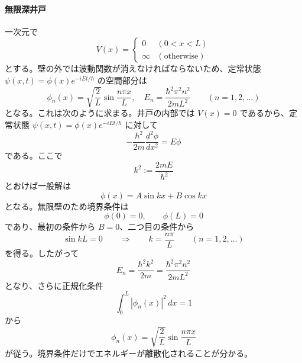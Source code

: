 \paragraph{無限深井戸}
一次元で
\[
V(x)=
\begin{cases}
0 & (0 < x < L) \\
\infty & (\text{otherwise})
\end{cases}
\]
とする。壁の外では波動関数が消えなければならないため、定常状態 $\psi(x,t)=\phi(x)e^{-iEt/\hbar}$ の空間部分は
\[
\phi_n(x)=\sqrt{\frac{2}{L}}\sin\frac{n\pi x}{L}, \quad E_n=\frac{\hbar^2\pi^2 n^2}{2mL^2}\qquad(n=1,2,\dots)
\]
となる。これは次のように求まる。井戸の内部では $V(x)=0$ であるから、定常状態 $\psi(x,t)=\phi(x)e^{-iEt/\hbar}$ に対して
\[
-\frac{\hbar^2}{2m}\frac{d^2\phi}{dx^2}=E\phi
\]
である。ここで
\[
k^2:=\frac{2mE}{\hbar^2}
\]
とおけば一般解は
\[
\phi(x)=A\sin kx+B\cos kx
\]
となる。無限壁のため境界条件は
\[
\phi(0)=0,\qquad \phi(L)=0
\]
であり、最初の条件から $B=0$、二つ目の条件から
\[
\sin kL=0
\qquad\Longrightarrow\qquad
k=\frac{n\pi}{L}\qquad(n=1,2,\dots)
\]
を得る。したがって
\[
E_n=\frac{\hbar^2k^2}{2m}=\frac{\hbar^2\pi^2n^2}{2mL^2}
\]
となり、さらに正規化条件
\[
\int_0^L |\phi_n(x)|^2\,dx = 1
\]
から
\[
\phi_n(x)=\sqrt{\frac{2}{L}}\sin\frac{n\pi x}{L}
\]
が従う。境界条件だけでエネルギーが離散化されることが分かる。


